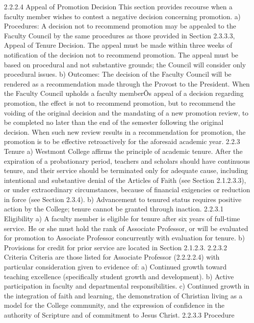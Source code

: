 \documentclass[letterpaper, 11pt]{article}
\begin{document}
2.2.2.4 Appeal of Promotion Decision
   This section provides recourse when a faculty member wishes to contest a negative decision concerning promotion.
a) Procedures:
   A decision not to recommend promotion may be appealed to the Faculty Council by the same procedures as those provided in Section 2.3.3.3, Appeal of Tenure Decision. The appeal must be made within three weeks of notification of the decision not to recommend promotion. The appeal must be based on procedural and not substantive grounds; the Council will consider only procedural issues.
b) Outcomes:
   The decision of the Faculty Council will be rendered as a recommendation made through the Provost to the President. When the Faculty Council upholds a faculty memberÕs appeal of a decision regarding promotion, the effect is not to recommend promotion, but to recommend the voiding of the original decision and the mandating of a new promotion review, to be completed no later than the end of the semester following the original decision.  When such new review results in a recommendation for promotion, the promotion is to be effective retroactively for the aforesaid academic year.
2.2.3 Tenure
a) Westmont College affirms the principle of academic tenure.  After the expiration of a probationary period, teachers and scholars should have continuous tenure, and their service should be terminated only for adequate cause, including intentional and substantive denial of the Articles of Faith (see Section 2.1.2.3.3), or under extraordinary circumstances, because of financial exigencies or reduction in force (see Section 2.3.4).
b) Advancement to tenured status requires positive action by the College; tenure cannot be granted through inaction.
2.2.3.1 Eligibility
a) A faculty member is eligible for tenure after six years of full-time service.  He or she must hold the rank of Associate Professor, or will be evaluated for promotion to Associate Professor concurrently with evaluation for tenure.
b) Provisions for credit for prior service are located in Section 2.1.2.3.
2.2.3.2 Criteria
   Criteria are those listed for Associate Professor (2.2.2.2.4) with particular consideration given to evidence of:
a) Continued growth toward teaching excellence (specifically student growth and development).
b) Active participation in faculty and departmental responsibilities.
c) Continued growth in the integration of faith and learning, the demonstration of Christian living as a model for the College community, and the expression of confidence in the authority of Scripture and of commitment to Jesus Christ.
2.2.3.3 Procedure
\end{document}
